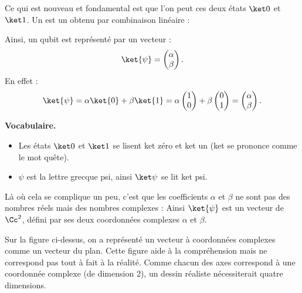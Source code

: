 \documentclass[11pt,class=report,crop=false]{standalone}
\begin{document}
  


\bigskip

Ce qui est nouveau et fondamental est que l'on peut  ces deux états $\ket0$ et $\ket1$.
Un  est un  obtenu par combinaison linéaire :

Ainsi, un qubit est représenté par un vecteur :
$$\ket{\psi} = \begin{pmatrix}\alpha\\\beta\end{pmatrix}.$$
En effet :
$$\ket{\psi} = \alpha \ket{0} + \beta \ket{1} = \alpha \begin{pmatrix}1\\0\end{pmatrix}  + \beta \begin{pmatrix}0\\1\end{pmatrix}
= \begin{pmatrix}\alpha\\\beta\end{pmatrix}.$$



\textbf{Vocabulaire.}
\begin{itemize}
  \item Les états $\ket0$ et $\ket1$ se lisent \og{}ket zéro\fg{} et \og{}ket un\fg{} (\og{}ket\fg{} se prononce comme le mot \og{}quête\fg{}).
  \item $\psi$ est la lettre grecque \og{}psi\fg{}, ainsi $\ket\psi$ se lit \og{}ket psi\fg{}.
\end{itemize}


\bigskip
Là où cela se complique un peu, c'est que les coefficients $\alpha$ et $\beta$ ne sont pas des nombres réels mais des nombres complexes : 
Ainsi $\ket{\psi}$ est un vecteur de $\Cc^2$, défini par ses deux coordonnées complexes $\alpha$ et $\beta$. 




Sur la figure ci-dessus, on a représenté un vecteur à coordonnées complexes comme un vecteur du plan. Cette figure aide à la compréhension mais ne correspond pas tout à fait à la réalité. Comme chacun des axes correspond à une coordonnée complexe (de dimension $2$), un dessin réaliste nécessiterait quatre dimensions. 
\end{document}
